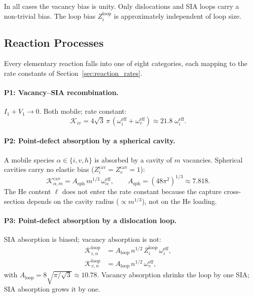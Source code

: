 \documentclass[pdflatex,sn-basic]{sn-jnl} %
\begin{document}
In all cases the vacancy bias is unity.  Only dislocations and SIA loops
carry a non-trivial bias.  The loop bias $Z_i^{\mathrm{loop}}$ is
approximately independent of loop size.


\subsection{Reaction Processes}
\label{sec:reaction_class}

Every elementary reaction falls into one of eight categories, each mapping
to the rate constants of Section~\ref{sec:reaction_rates}.

\paragraph{P1: Vacancy--SIA recombination.}
$I_1 + V_1 \to 0$. Both mobile; rate constant:
\begin{equation}\label{eq:P1}
    \mathcal{K}_{iv}
    = 4\sqrt{3}\,\pi\,
      (\omega_i^{\mathrm{eff}}+\omega_v^{\mathrm{eff}})
    \approx 21.8\;\omega_i^{\mathrm{eff}}.
\end{equation}

\paragraph{P2: Point-defect absorption by a spherical cavity.}
A mobile species $\alpha \in \{i,v,h\}$ is absorbed by a cavity of $m$
vacancies. Spherical cavities carry no elastic bias
($Z_i^{\mathrm{cav}} = Z_v^{\mathrm{cav}} = 1$):
\begin{equation}\label{eq:P2}
    \mathcal{K}_{\alpha,m}^{\mathrm{cav}}
    = A_{\mathrm{sph}}\,m^{1/3}\,\omega_\alpha^{\mathrm{eff}},
    \qquad A_{\mathrm{sph}} = (48\pi^2)^{1/3} \approx 7.818.
\end{equation}
The He content $\ell$ does not enter the rate constant because the capture
cross-section depends on the cavity radius ($\propto m^{1/3}$), not on the
He loading.

\paragraph{P3: Point-defect absorption by a dislocation loop.}
SIA absorption is biased; vacancy absorption is not:
\begin{align}
    \mathcal{K}_{i,n}^{\mathrm{loop}}
    &= A_{\mathrm{loop}}\,n^{1/2}\,Z_i^{\mathrm{loop}}\,
       \omega_i^{\mathrm{eff}},
    \label{eq:P3_i}\\[2pt]
    \mathcal{K}_{v,n}^{\mathrm{loop}}
    &= A_{\mathrm{loop}}\,n^{1/2}\,
       \omega_v^{\mathrm{eff}},
    \label{eq:P3_v}
\end{align}
with $A_{\mathrm{loop}} = 8\sqrt{\pi/\sqrt{3}} \approx 10.78$.
Vacancy absorption shrinks the loop by one SIA; SIA absorption grows it
by one.
\end{document}
